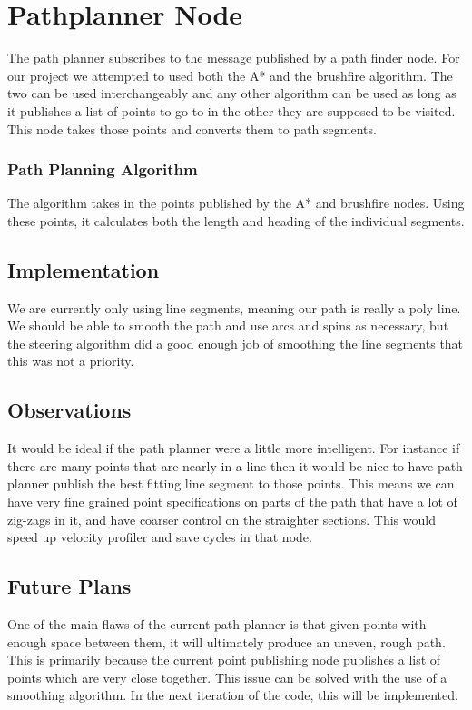 \section{Pathplanner Node}

The path planner subscribes to the message published by a path finder node. For our project we attempted to used both the A* and the brushfire algorithm. The two can be used interchangeably and any other algorithm can be used as long as it publishes a list of points to go to in the other they are supposed to be visited. This node takes those points and converts them to path segments.

\subsubsection{Path Planning Algorithm}
The algorithm takes in the points published by the A* and brushfire nodes. Using these points, it calculates both the length and heading of the individual segments.

\subsection{Implementation}
We are currently only using line segments, meaning our path is really a poly line. We should be able to smooth the path and use arcs and spins as necessary, but the steering algorithm did a good enough job of smoothing the line segments that this was not a priority.

\subsection{Observations}
It would be ideal if the path planner were a little more intelligent. For instance if there are many points that are nearly in a line then it would be nice to have path planner publish the best fitting line segment to those points. This means we can have very fine grained point specifications on parts of the path that have a lot of zig-zags in it, and have coarser control on the straighter sections. This would speed up velocity profiler and save cycles in that node.

\subsection{Future Plans}
One of the main flaws of the current path planner is that given points with enough space between them, it will ultimately produce an uneven, rough path. This is primarily because the current point publishing node publishes a list of points which are very close together. This issue can be solved with the use of a smoothing algorithm. In the next iteration of the code, this will be implemented.
